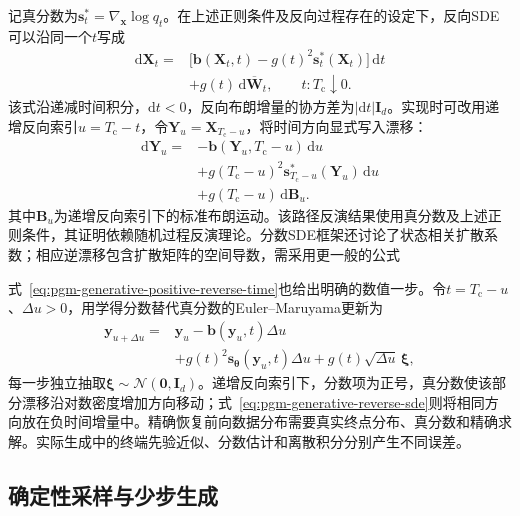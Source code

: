 记真分数为$\bm{s}_t^*=\nabla_{\bm{x}}\log q_t$。在上述正则条件及反向过程存在的设定下，反向SDE可以沿同一个$t$写成
\begin{equation}
  \label{eq:pgm-generative-reverse-sde}
  \begin{aligned}
    \mathrm{d}\bm{X}_t
    ={}&\bigl[\bm{b}(\bm{X}_t,t)-g(t)^2\bm{s}_t^*(\bm{X}_t)\bigr]
         \,\mathrm{d}t\\
       &+g(t)\,\mathrm{d}\overline{\bm{W}}_t,
    \qquad t:T_{\mathrm{c}}\downarrow0.
  \end{aligned}
\end{equation}
该式沿递减时间积分，$\mathrm{d}t<0$，反向布朗增量的协方差为$|\mathrm{d}t|\bm{I}_d$。实现时可改用递增反向索引$u=T_{\mathrm{c}}-t$，令$\bm{Y}_u=\bm{X}_{T_{\mathrm{c}}-u}$，将时间方向显式写入漂移：
\begin{equation}
  \label{eq:pgm-generative-positive-reverse-time}
  \begin{aligned}
    \mathrm{d}\bm{Y}_u
      ={}&-\bm{b}(\bm{Y}_u,T_{\mathrm{c}}-u)\,\mathrm{d}u\\
         &+g(T_{\mathrm{c}}-u)^2
              \bm{s}_{T_{\mathrm{c}}-u}^*(\bm{Y}_u)\,\mathrm{d}u\\
         &+g(T_{\mathrm{c}}-u)\,\mathrm{d}\bm{B}_u.
  \end{aligned}
\end{equation}
其中$\bm{B}_u$为递增反向索引下的标准布朗运动。该路径反演结果使用真分数及上述正则条件，其证明依赖随机过程反演理论。分数SDE框架还讨论了状态相关扩散系数；相应逆漂移包含扩散矩阵的空间导数，需采用更一般的公式

式~\eqref{eq:pgm-generative-positive-reverse-time}也给出明确的数值一步。令$t=T_{\mathrm{c}}-u$、$\Delta u>0$，用学得分数替代真分数的Euler--Maruyama更新为
\[
  \begin{aligned}
    \bm{y}_{u+\Delta u}
      ={}&\bm{y}_u-\bm{b}(\bm{y}_u,t)\Delta u\\
         &+g(t)^2\bm{s}_{\bm{\theta}}(\bm{y}_u,t)\Delta u
          +g(t)\sqrt{\Delta u}\,\bm{\xi},
  \end{aligned}
\]
每一步独立抽取$\bm{\xi}\sim\mathcal{N}(\bm{0},\bm{I}_d)$。递增反向索引下，分数项为正号，真分数使该部分漂移沿对数密度增加方向移动；式~\eqref{eq:pgm-generative-reverse-sde}则将相同方向放在负时间增量中。精确恢复前向数据分布需要真实终点分布、真分数和精确求解。实际生成中的终端先验近似、分数估计和离散积分分别产生不同误差。

\subsection{确定性采样与少步生成}
\label{sec:pgm-generative-deterministic-sampling}

